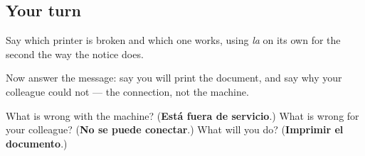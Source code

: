 \subsection*{Your turn}
Say which printer is broken and which one works, using \emph{la} on its own for the second the way the notice does.

Now answer the message: say you will print the document, and say why your colleague could not — the connection, not the machine.

\begin{tcolorbox}[breakable,colback=teal!4,colframe=teal!35!black,title={Before you move on}]
What is wrong with the machine? (\textbf{Está fuera de servicio}.) What is wrong for your colleague? (\textbf{No se puede conectar}.) What will you do? (\textbf{Imprimir el documento}.)
\end{tcolorbox}

